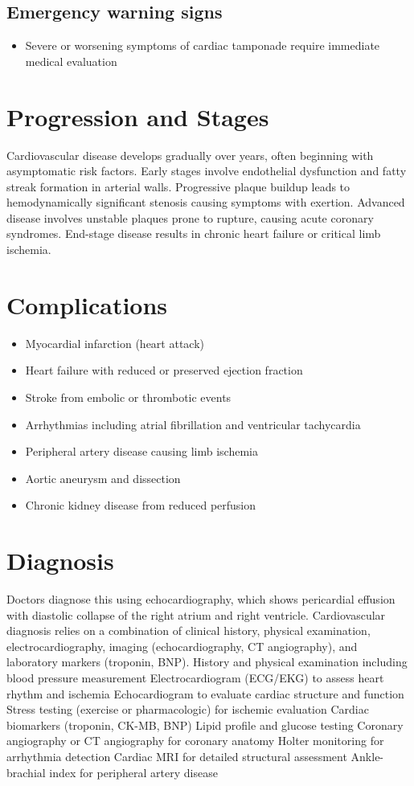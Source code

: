 \subsection{Emergency warning signs}
\begin{itemize}[noitemsep]
  \item Severe or worsening symptoms of cardiac tamponade require immediate medical evaluation
\end{itemize}
\section{Progression and Stages}
Cardiovascular disease develops gradually over years, often beginning with asymptomatic risk factors. Early stages involve endothelial dysfunction and fatty streak formation in arterial walls. Progressive plaque buildup leads to hemodynamically significant stenosis causing symptoms with exertion. Advanced disease involves unstable plaques prone to rupture, causing acute coronary syndromes. End-stage disease results in chronic heart failure or critical limb ischemia.
\section{Complications}
\begin{itemize}[noitemsep]
  \item Myocardial infarction (heart attack)
  \item Heart failure with reduced or preserved ejection fraction
  \item Stroke from embolic or thrombotic events
  \item Arrhythmias including atrial fibrillation and ventricular tachycardia
  \item Peripheral artery disease causing limb ischemia
  \item Aortic aneurysm and dissection
  \item Chronic kidney disease from reduced perfusion
\end{itemize}
\section{Diagnosis}
Doctors diagnose this using echocardiography, which shows pericardial effusion with diastolic collapse of the right atrium and right ventricle. Cardiovascular diagnosis relies on a combination of clinical history, physical examination, electrocardiography, imaging (echocardiography, CT angiography), and laboratory markers (troponin, BNP). History and physical examination including blood pressure measurement Electrocardiogram (ECG/EKG) to assess heart rhythm and ischemia Echocardiogram to evaluate cardiac structure and function Stress testing (exercise or pharmacologic) for ischemic evaluation Cardiac biomarkers (troponin, CK-MB, BNP) Lipid profile and glucose testing Coronary angiography or CT angiography for coronary anatomy Holter monitoring for arrhythmia detection Cardiac MRI for detailed structural assessment Ankle-brachial index for peripheral artery disease

